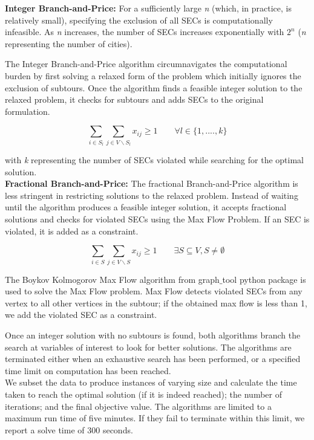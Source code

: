 \documentclass[12pt]{article}
\numberwithin{equation}{section}
\begin{document}
\textbf{Integer Branch-and-Price:} For a sufficiently large \textit{n} (which, in practice, is relatively small), specifying the exclusion of all SECs is computationally infeasible. As \textit{n} increases, the number of SECs increases exponentially with $2^n$ (\textit{n} representing the number of cities).

The Integer Branch-and-Price algorithm circumnavigates the computational burden by first solving a relaxed form of the problem which initially ignores the exclusion of subtours. Once the algorithm finds a feasible integer solution to the relaxed problem, it checks for subtours and adds SECs to the original formulation. 

\begin{equation}
\sum_{i \in S_l} \sum_{j \in V \backslash S_l} x_{ij} \geq 1 \quad \quad \forall l \in \{1, ...., k \}
\end{equation}

with \textit{k} representing the number of SECs violated while searching for the optimal solution.\\

\noindent\textbf{Fractional Branch-and-Price:} The fractional Branch-and-Price algorithm is less stringent in restricting solutions to the relaxed problem. Instead of waiting until the algorithm produces a feasible integer solution, it accepts fractional solutions and checks for violated SECs using the Max Flow Problem. If an SEC is violated, it is added as a constraint.

\begin{equation}
\sum_{i \in S} \sum_{j \in V \backslash S} x_{ij} \ge 1 \quad \quad \exists S  \subseteq V , S  \ne \emptyset 
\end{equation}

The Boykov Kolmogorov Max Flow algorithm from graph$\_$tool python package is used to solve the Max Flow problem. Max Flow detects violated SECs from any vertex to all other vertices in the subtour; if the obtained max flow is less than 1, we add the violated SEC as a constraint.

Once an integer solution with no subtours is found, both algorithms branch the search at variables of interest to look for better solutions. The algorithms are terminated either when an exhaustive search has been performed, or a specified time limit on computation has been reached.\\

We subset the data to produce instances of varying size and calculate the time taken to reach the optimal solution (if it is indeed reached); the number of iterations; and the final objective value. The algorithms are limited to a maximum run time of five minutes. If they fail to terminate within this limit, we report a solve time of 300 seconds.
\end{document}
